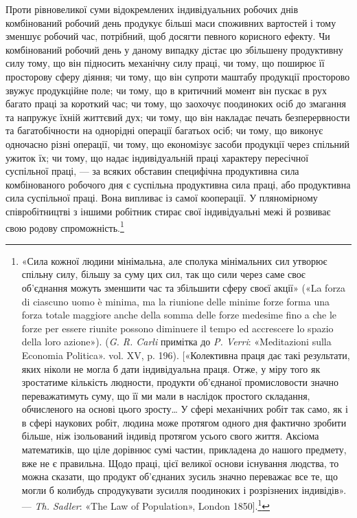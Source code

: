 Проти рівновеликої суми відокремлених індивідуальних робочих
днів комбінований робочий день продукує більші маси споживних
вартостей і тому зменшує робочий час, потрібний, щоб
досягти певного корисного ефекту. Чи комбінований робочий
день у даному випадку дістає цю збільшену продуктивну силу
тому, що він підносить механічну силу праці, чи тому, що поширює
її просторову сферу діяння; чи тому, що він супроти маштабу
продукції просторово звужує продукційне поле; чи тому, що в
критичний момент він пускає в рух багато праці за короткий час;
чи тому, що заохочує поодиноких осіб до змагання та напружує
їхній життєвий дух; чи тому, що він накладає печать безперервности
та багатобічности на однорідні операції багатьох осіб; чи
тому, що виконує одночасно різні операції, чи тому, що економізує
засоби продукції через спільний ужиток їх; чи тому, що надає
індивідуальній праці характеру пересічної суспільної праці, —
за всяких обставин специфічна продуктивна сила комбінованого
робочого дня є суспільна продуктивна сила праці, або продуктивна
сила суспільної праці. Вона випливає із самої кооперації. У пляномірному
співробітництві з іншими робітник стирає свої індивідуальні
межі й розвиває свою родову спроможність.\footnote{
«Сила кожної людини мінімальна, але сполука мінімальних сил
утворює спільну силу, більшу за суму цих сил, так що сили через саме
своє об’єднання можуть зменшити час та збільшити сферу своєї акції»
(«La forza di ciascuno uomo è minima, ma la riunione delle minime forze
forma una forza totale maggiore anche della somma delle forze medesime
fino a che le forze per essere riunite possono diminuere il tempo ed accrescere
lo spazio della loro azione»). (\emph{G. R. Carli} примітка до \emph{P. Verri}: «Meditazioni
sulla Economia Politica». vol. XV, p. 196). [«Колективна
праця дає такі результати, яких ніколи не могла б дати індивідуальна
праця. Отже, у міру того як зростатиме кількість людности, продукти
об’єднаної промисловости значно переважатимуть суму, що її ми мали
в наслідок простого складання, обчисленого на основі цього зросту\dots{}
У сфері механічних робіт так само, як і в сфері наукових робіт, людина
може протягом одного дня фактично зробити більше, ніж ізольований
індивід протягом усього свого життя. Аксіома математиків, що ціле
дорівнює сумі частин, прикладена до нашого предмету, вже не є правильна.
Щодо праці, цієї великої основи існування людства, то можна
сказати, що продукт об’єднаних зусиль значно переважає все те, що
могли б колибудь спродукувати зусилля поодиноких і розрізнених індивідів».
— \emph{Th. Sadler}: «The Law of Population», London 1850].\footnote*{
Наведене тут у прямих дужках ми беремо з французького видання.
(«Le Capital etc.», v. I, ch. XIII, p. 143). \emph{Ред.}
}
}
